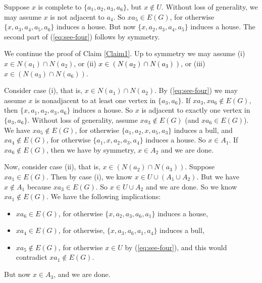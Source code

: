 \documentclass[a4paper,11pt]{article}
\theoremstyle{case}
\newcommand{\thecolor}{black}
\begin{document}
    Suppose $x$ is complete to $\{ a_1, a_2, a_3, a_6\}$, but $x \not\in U$. Without loss of generality, we may assume $x$ is not adjacent to $a_4$. So $x a_5 \in E(G)$, for otherwise $\{ x, a_3, a_4, a_5, a_6 \}$ induces a house. But now $\{ x, a_2, a_3, a_4, a_5\}$ induces a house. The second part of (\ref{eq:see-four}) follows by symmetry. 

    We continue the proof of Claim \ref{Claim1}. Up to symmetry we may assume (i) $x\in N(a_1)\cap N(a_2)$, or (ii) \textcolor{\thecolor}{ $x\in (N(a_2)\cap N(a_3))$}, or (iii) $x\in (N(a_3)\cap N(a_6))$. 
    
   Consider  case (i), that is, $x\in N(a_1) \cap N(a_2)$. By (\ref{eq:see-four}) we may assume $x$ is nonadjacent to at least one vertex in $\{ a_3, a_6 \}$. If $x a_3, x a_6 \notin E(G)$, then $\{ x, a_1, a_2, a_3, a_6\}$ induces a house. So $x$ is adjacent to exactly one vertex in $\{ a_3, a_6 \}$. Without loss of generality, assume $x a_3 \notin E(G)$ (and $x a_6 \in E(G)$). We have $x a_5 \notin E(G)$, for otherwise $\{   a_1, a_2, x, a_5, a_3 \}$ induces a bull, and $x a_4 \notin E(G)$, for otherwise $\{ a_1, x, a_2, a_3, a_4\}$ induces a house. So $x \in A_1$. If $x a_6 \notin E(G)$, then we have by symmetry, $x \in A_2$ and we are done.
   

Now, consider case (ii), that is, $x\in (N(a_2)\cap N(a_3))$. Suppose $x a_1 \in E(G)$. Then by case (i), we know $x \in U \cup (A_1 \cup A_2)$. But we have $x \not\in A_1$ because $x a_3 \in E(G)$. So $x \in U \cup A_2$ and we are done. So we know $x a_1 \not\in E(G)$. We have the following implications: 
\begin{itemize} 
\item $x a_6 \in E(G)$, for otherwise $\{ x, a_2, a_3, a_6, a_1 \}$ induces a house,
\item $ x a_4 \in E(G)$, for otherwise, $\{x, a_3, a_6, a_1, a_4 \}$ induces a bull, 
\item $x a_5 \not\in E(G)$, for otherwise $x \in U$ by (\ref{eq:see-four}), and this would contradict $x a_1 \not\in E(G)$.
\end{itemize} 
But now $x \in A_3$, and we are done. 
\end{document}

